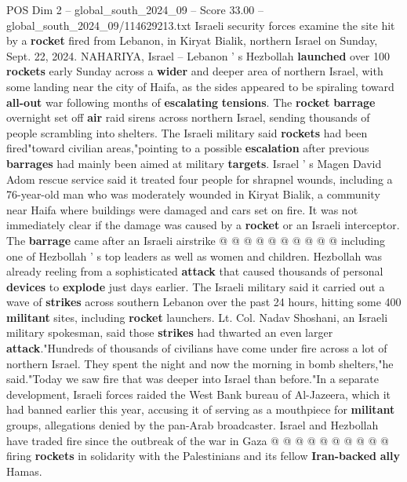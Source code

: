 \begin{textsample}{POS Dim 2 – global\_south\_2024\_09 – Score 33.00 – global\_south\_2024\_09/114629213.txt}  \label{ex:f2_pos_034}
Israeli security forces examine the site hit by a \textbf{rocket} fired from Lebanon, in Kiryat Bialik, northern Israel on Sunday, Sept. 22, 2024.
NAHARIYA, Israel -- Lebanon ' s Hezbollah \textbf{launched} over 100 \textbf{rockets} early Sunday across a \textbf{wider} and deeper area of northern Israel, with some landing near the city of Haifa, as the sides appeared to be spiraling toward \textbf{all-out} war following months of \textbf{escalating} \textbf{tensions}.
The \textbf{rocket} \textbf{barrage} overnight set off \textbf{air} raid sirens across northern Israel, sending thousands of people scrambling into shelters.
The Israeli military said \textbf{rockets} had been fired"toward civilian areas,"pointing to a possible \textbf{escalation} after previous \textbf{barrages} had mainly been aimed at military \textbf{targets}.
Israel ' s Magen David Adom rescue service said it treated four people for shrapnel wounds, including a 76-year-old man who was moderately wounded in Kiryat Bialik, a community near Haifa where buildings were damaged and cars set on fire.
It was not immediately clear if the damage was caused by a \textbf{rocket} or an Israeli interceptor.
The \textbf{barrage} came after an Israeli airstrike @ @ @ @ @ @ @ @ @ @ including one of Hezbollah ' s top leaders as well as women and children.
Hezbollah was already reeling from a sophisticated \textbf{attack} that caused thousands of personal \textbf{devices} to \textbf{explode} just days earlier.
The Israeli military said it carried out a wave of \textbf{strikes} across southern Lebanon over the past 24 hours, hitting some 400 \textbf{militant} sites, including \textbf{rocket} launchers.
Lt.
Col.
Nadav Shoshani, an Israeli military spokesman, said those \textbf{strikes} had thwarted an even larger \textbf{attack}."Hundreds of thousands of civilians have come under fire across a lot of northern Israel.
They spent the night and now the morning in bomb shelters,"he said."Today we saw fire that was deeper into Israel than before."In a separate development, Israeli forces raided the West Bank bureau of Al-Jazeera, which it had banned earlier this year, accusing it of serving as a mouthpiece for \textbf{militant} groups, allegations denied by the pan-Arab broadcaster.
Israel and Hezbollah have traded fire since the outbreak of the war in Gaza @ @ @ @ @ @ @ @ @ @ firing \textbf{rockets} in solidarity with the Palestinians and its fellow \textbf{Iran-backed} \textbf{ally} Hamas.

\end{textsample}
